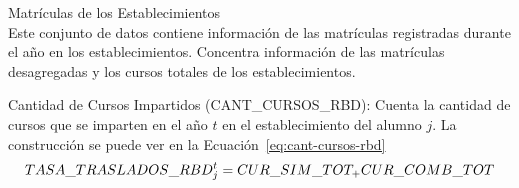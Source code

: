 \begin{longdescription}
\begin{itemize}
            \end{itemize}   
        \item[Matrículas de los Establecimientos] \hfill \\
        Este conjunto de datos contiene información de las matrículas registradas durante el año en los establecimientos. Concentra información de las matrículas desagregadas y los cursos totales de los establecimientos.
            \begin{longdescription}
                \item[Cantidad de Cursos Impartidos]
                (CANT\_CURSOS\_RBD): Cuenta la cantidad de cursos que se imparten en el año $t$ en el establecimiento del alumno $j$. La construcción se puede ver en la Ecuación~\ref{eq:cant-cursos-rbd}
              \begin{equation}
              \centering
                TASA\_TRASLADOS\_RBD_{j}^{t} = CUR\_SIM\_TOT_ + CUR\_COMB\_TOT
                \label{eq:cant-cursos-rbd}
              \end{equation}
                

\end{longdescription}
\end{longdescription}
